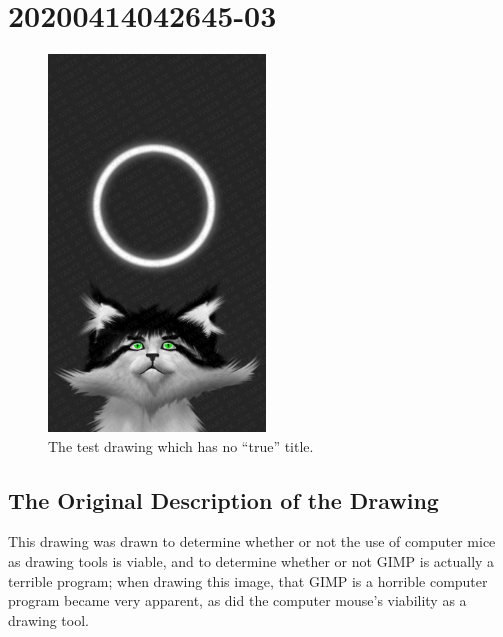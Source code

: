 \documentclass{report}
\newcommand\imageheight{10cm}
\begin{document}
\chapter{20200414042645-03}
\begin{figure}[ht]
	\centering
	\includegraphics[height=\imageheight]{20200414042645-03/20200414042645-03.jpg}
	\caption[center]{The test drawing which has no ``true'' title.}
\end{figure}
\section{The Original Description of the Drawing}
This drawing was drawn to determine whether or not the use of computer mice as drawing tools is viable, and to determine whether or not GIMP is actually a terrible program; when drawing this image, that GIMP is a horrible computer program became very apparent, as did the computer mouse's viability as a drawing tool.
\end{document}
